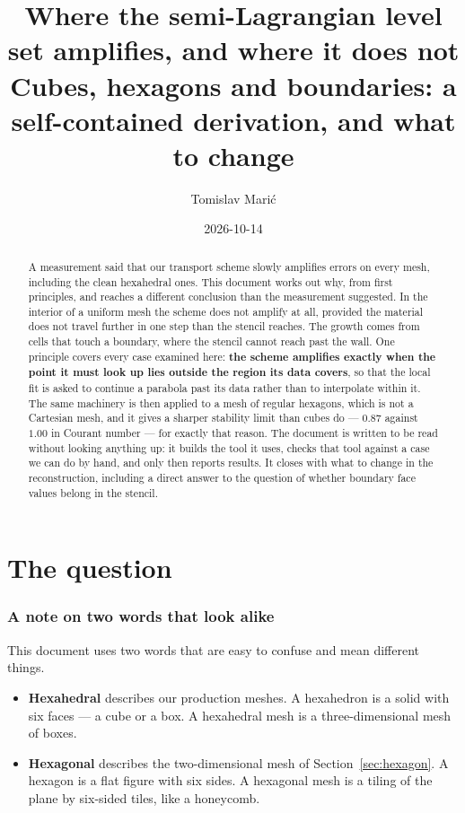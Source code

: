 \documentclass[11pt,a4paper]{article}
\title{Where the semi-Lagrangian level set amplifies, and where it does not\\
       \large Cubes, hexagons and boundaries: a self-contained derivation, and what to change}
\author{Tomislav Mari\'c}
\date{2026-10-14}
\begin{document}
\maketitle

\begin{abstract}
A measurement said that our transport scheme slowly amplifies errors on every mesh,
including the clean hexahedral ones. This document works out why, from first principles, and
reaches a different conclusion than the measurement suggested. In the interior of a uniform
mesh the scheme does not amplify at all, provided the material does not travel further in one
step than the stencil reaches. The growth comes from cells that touch a boundary, where the
stencil cannot reach past the wall. One principle covers every case examined here:
\textbf{the scheme amplifies exactly when the point it must look up lies outside the region
its data covers}, so that the local fit is asked to continue a parabola past its data rather
than to interpolate within it. The same machinery is then applied to a mesh of regular
hexagons, which is not a Cartesian mesh, and it gives a sharper stability limit than cubes do
--- $0.87$ against $1.00$ in Courant number --- for exactly that reason. The document is
written to be read without looking anything up: it builds the tool it uses, checks that tool
against a case we can do by hand, and only then reports results. It closes with what to change
in the reconstruction, including a direct answer to the question of whether boundary face
values belong in the stencil.
\end{abstract}

\tableofcontents

\part{The question}

\section*{A note on two words that look alike}

This document uses two words that are easy to confuse and mean different things.

\begin{itemize}
\item \textbf{Hexahedral} describes our production meshes. A hexahedron is a solid with six
      faces --- a cube or a box. A hexahedral mesh is a three-dimensional mesh of boxes.
\item \textbf{Hexagonal} describes the two-dimensional mesh of Section~\ref{sec:hexagon}. A
      hexagon is a flat figure with six sides. A hexagonal mesh is a tiling of the plane by
      six-sided tiles, like a honeycomb.
\end{itemize}
\end{document}
